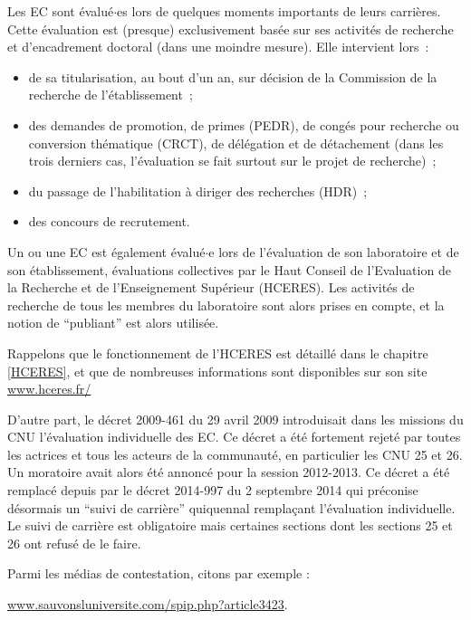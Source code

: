 Les EC sont \'evalu\'e$\cdot$es lors de quelques moments importants de leurs carri\`eres.
Cette \'evaluation est (presque) exclusivement bas\'ee sur ses activit\'es de recherche
et d'encadrement doctoral (dans une moindre mesure).
Elle intervient lors~:
\begin{itemize}
\item de sa titularisation, au bout d'un an, sur d\'ecision de la Commission de la recherche de l'\'etablissement~;
\item des demandes de promotion, de primes (PEDR),
de cong\'es pour recherche ou conversion
th\'ematique (CRCT), de d\'el\'egation et de d\'etachement (dans les
trois derniers cas, l'\'evaluation se fait surtout sur le projet de
recherche)~;
\item du passage de l'habilitation \`a diriger des recherches (HDR)~;
\item des concours de recrutement.
\end{itemize}
Un ou une EC est \'egalement \'evalu\'e$\cdot$e lors de l'\'evaluation de son laboratoire
et de son \'etablissement,
\'evaluations collectives par le Haut Conseil de l'Evaluation de la
Recherche et de l'Enseignement Sup\'erieur (HCERES).
Les activit\'es de recherche de tous les membres du
laboratoire sont alors prises en compte, et la notion de ``publiant'' est
alors utilis\'ee.

Rappelons que le fonctionnement de l'HCERES est d\'etaill\'e dans le chapitre \ref{HCERES},
et que de nombreuses informations sont disponibles sur son site
\url{www.hceres.fr/}

D'autre part, le d\'ecret 2009-461 du 29 avril 2009 introduisait dans les missions du CNU l'\'evaluation individuelle des EC. 
Ce d\'ecret a \'et\'e fortement rejet\'e par toutes les actrices et tous les acteurs de la communaut\'e, en particulier les CNU 25 et 26.
Un moratoire avait alors \'et\'e annonc\'e pour la session 2012-2013. 
Ce d\'ecret a \'et\'e remplac\'e depuis par le d\'ecret 2014-997 du 2 septembre 2014 qui pr\'econise
d\'esormais un ``suivi de carri\`ere'' quiquennal rempla\c{c}ant l'\'evaluation individuelle. Le suivi de carrière est obligatoire mais certaines sections dont les sections 25 et 26 ont refusé de le faire.


Parmi les m\'edias de contestation, citons par exemple :

\url{www.sauvonsluniversite.com/spip.php?article3423}.

